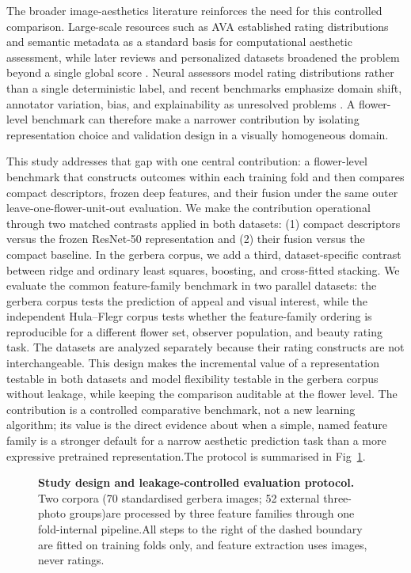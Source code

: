\documentclass[10pt,letterpaper]{article}
\begin{document}
The broader image-aesthetics literature reinforces the need for this controlled comparison. Large-scale resources such as AVA established rating distributions and semantic metadata as a standard basis for computational aesthetic assessment, while later reviews and personalized datasets broadened the problem beyond a single global score \cite{murray2012,zhangmy2021,yang2022}. Neural assessors model rating distributions rather than a single deterministic label, and recent benchmarks emphasize domain shift, annotator variation, bias, and explainability as unresolved problems \cite{talebi2018,huang2024aesbench,goree2025,li2025}. A flower-level benchmark can therefore make a narrower contribution by isolating representation choice and validation design in a visually homogeneous domain.

This study addresses that gap with one central contribution: a flower-level benchmark that constructs outcomes within each training fold and then compares compact descriptors, frozen deep features, and their fusion under the same outer leave-one-flower-unit-out evaluation. We make the contribution operational through two matched contrasts applied in both datasets: (1) compact descriptors versus the frozen ResNet-50 representation and (2) their fusion versus the compact baseline. In the gerbera corpus, we add a third, dataset-specific contrast between ridge and ordinary least squares, boosting, and cross-fitted stacking. We evaluate the common feature-family benchmark in two parallel datasets: the gerbera corpus tests the prediction of appeal and visual interest, while the independent Hula--Flegr corpus tests whether the feature-family ordering is reproducible for a different flower set, observer population, and beauty rating task. The datasets are analyzed separately because their rating constructs are not interchangeable. This design makes the incremental value of a representation testable in both datasets and model flexibility testable in the gerbera corpus without leakage, while keeping the comparison auditable at the flower level. The contribution is a controlled comparative benchmark, not a new learning algorithm; its value is the direct evidence about when a simple, named feature family is a stronger default for a narrow aesthetic prediction task than a more expressive pretrained representation.The protocol is summarised in Fig~\ref{fig:scheme}.


\begin{figure}[!h]
\caption{\textbf{Study design and leakage-controlled evaluation protocol.} Two corpora (70 standardised gerbera images; 52 external three-photo groups)are processed by three feature families through one fold-internal pipeline.All steps to the right of the dashed boundary are fitted on training folds only, and feature extraction uses images, never ratings.}
\label{fig:scheme}
\end{figure}
\end{document}
